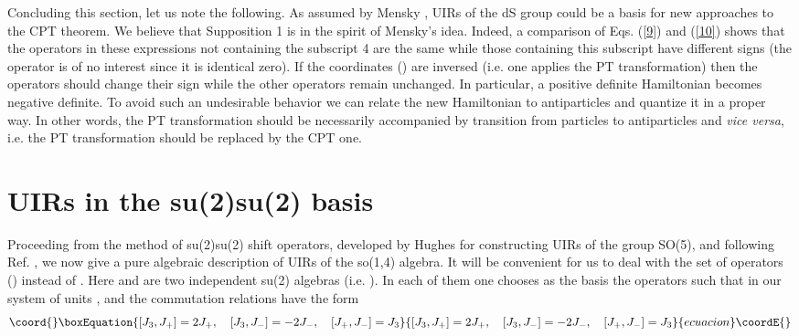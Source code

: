 \documentclass[a4paper,12pt]{article}%
\begin{document}
Concluding this section, let us note the following.
As assumed by Mensky \cite{Men}, UIRs of the dS
group could be a basis for new approaches to the CPT
theorem. We believe that Supposition 1 is in the spirit
of Mensky's idea. Indeed, a comparison of Eqs.
(\ref{9}) and (\ref{10}) shows that the operators
\coordHE{} in these expressions not containing the 
subscript 4 are the same while those containing 
this subscript have different signs (the operator
\coordHE{} is of no interest since it is identical 
zero). If the coordinates \coordHE{} (\coordHE{})
are inversed (i.e. one applies the PT transformation)
then the operators \coordHE{} should change their
sign while the other operators remain unchanged.
In particular, a positive definite Hamiltonian 
becomes negative definite. To avoid such an
undesirable behavior we can relate the new Hamiltonian
to antiparticles and quantize it in a proper way.
In other words, the PT transformation should be
necessarily accompanied by transition from particles to
antiparticles and {\it vice versa}, i.e. the PT 
transformation should be replaced by the CPT one.    

\section{UIRs in the su(2)\myHighlight{$\times$}\coordHE{}su(2) basis}
\label{S4}

Proceeding from the method of su(2)\myHighlight{$\times$}\coordHE{}su(2) shift
operators, developed by Hughes \cite{Hug} for constructing
UIRs of the group SO(5), and following Ref. \cite{lev3},
we now give a pure algebraic description of UIRs of
the so(1,4) algebra. It will be convenient for us to  deal
with the set of operators \coordHE{} (\coordHE{})
instead  of \coordHE{}.
Here \coordHE{} and \coordHE{} are two independent su(2) algebras
(i.e. \coordHE{}).
In each of them one chooses as the basis the operators  
\coordHE{} such that in our system of units 
\coordHE{}, \coordHE{} and the commutation
relations have the form
\begin{equation}\coord{}\boxEquation{
[J_3,J_+]=2J_+,\quad [J_3,J_-]=-2J_-,\quad [J_+,J_-]=J_3
\label{14}
}{
[J_3,J_+]=2J_+,\quad [J_3,J_-]=-2J_-,\quad [J_+,J_-]=J_3
}{ecuacion}\coordE{}\end{equation}
\end{document}
